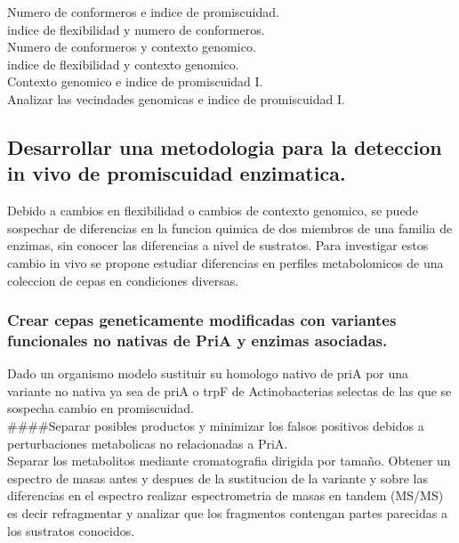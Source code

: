 \documentclass[12pt,twoside]{reedthesis}
\begin{document}
  Numero de conformeros e indice de promiscuidad.\\
  indice de flexibilidad y numero de conformeros.\\
  Numero de conformeros y contexto genomico.\\
  indice de flexibilidad y contexto genomico.\\
  Contexto genomico e indice de promiscuidad I.\\
  Analizar las vecindades genomicas e indice de promiscuidad I.
  
  \subsection{Desarrollar una metodologia para la deteccion in vivo de
  promiscuidad
  enzimatica.}\label{desarrollar-una-metodologia-para-la-deteccion-in-vivo-de-promiscuidad-enzimatica.}
  
  Debido a cambios en flexibilidad o cambios de contexto genomico, se
  puede sospechar de diferencias en la funcion quimica de dos miembros de
  una familia de enzimas, sin conocer las diferencias a nivel de
  sustratos. Para investigar estos cambio in vivo se propone estudiar
  diferencias en perfiles metabolomicos de una coleccion de cepas en
  condiciones diversas.
  
  \subsubsection{Crear cepas geneticamente modificadas con variantes
  funcionales no nativas de PriA y enzimas
  asociadas.}\label{crear-cepas-geneticamente-modificadas-con-variantes-funcionales-no-nativas-de-pria-y-enzimas-asociadas.}
  
  Dado un organismo modelo sustituir su homologo nativo de priA por una
  variante no nativa ya sea de priA o trpF de Actinobacterias selectas de
  las que se sospecha cambio en promiscuidad.\\
  \#\#\#\#Separar posibles productos y minimizar los falsos positivos
  debidos a perturbaciones metabolicas no relacionadas a PriA.\\
  Separar los metabolitos mediante cromatografia dirigida por tamaño.
  Obtener un espectro de masas antes y despues de la sustitucion de la
  variante y sobre las diferencias en el espectro realizar espectrometria
  de masas en tandem (MS/MS) es decir refragmentar y analizar que los
  fragmentos contengan partes parecidas a los sustratos conocidos.
  
\end{document}
